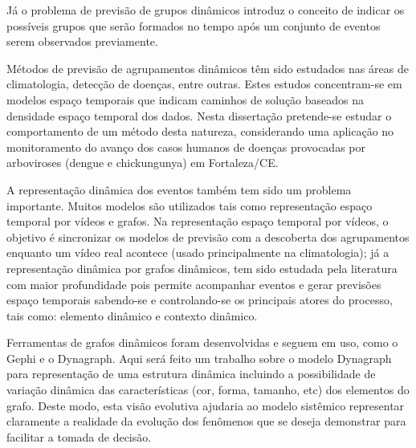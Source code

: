 Já o problema de previsão de grupos dinâmicos introduz o conceito de indicar os
possíveis grupos que serão formados no tempo após um conjunto de eventos serem
observados previamente.

Métodos de previsão de agrupamentos dinâmicos têm sido estudados nas áreas de climatologia, detecção de doenças, entre outras. Estes estudos concentram-se em modelos espaço temporais que indicam caminhos de solução baseados na densidade espaço temporal dos dados. Nesta dissertação pretende-se estudar o comportamento de um método desta natureza, considerando uma aplicação no monitoramento do avanço dos casos humanos de doenças provocadas por arboviroses (dengue e chickungunya) em Fortaleza/CE.

A representação dinâmica dos eventos também tem sido um problema importante. Muitos modelos são utilizados tais como representação espaço temporal por vídeos e grafos. Na representação espaço temporal por vídeos, o objetivo é sincronizar os modelos de previsão com a descoberta dos agrupamentos enquanto um vídeo real acontece (usado principalmente na climatologia); já a representação dinâmica por grafos dinâmicos, tem sido estudada pela literatura com maior profundidade pois permite acompanhar eventos e gerar previsões espaço temporais sabendo-se e controlando-se os principais atores do processo, tais como: elemento dinâmico e contexto dinâmico.

Ferramentas de grafos dinâmicos foram desenvolvidas e seguem em uso, como o Gephi e o Dynagraph. Aqui será feito um trabalho sobre o modelo Dynagraph para representação de uma estrutura dinâmica incluindo a possibilidade de variação dinâmica das características (cor, forma, tamanho, etc) dos elementos do grafo. Deste modo, esta visão evolutiva ajudaria ao modelo sistêmico representar claramente a realidade da evolução dos fenômenos que se deseja demonstrar para facilitar a tomada de decisão.





